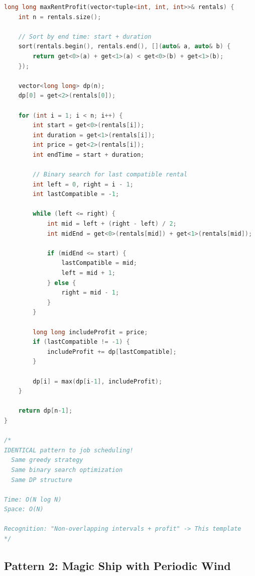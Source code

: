 \documentclass[11pt,a4paper,oneside]{book}
\begin{document}
\begin{lstlisting}[language=C++, caption=Complete Job Scheduling Solutions - NEW PROBLEMS]
long long maxRentProfit(vector<tuple<int, int, int>>& rentals) {
    int n = rentals.size();
    
    // Sort by end time: start + duration
    sort(rentals.begin(), rentals.end(), [](auto& a, auto& b) {
        return get<0>(a) + get<1>(a) < get<0>(b) + get<1>(b);
    });
    
    vector<long long> dp(n);
    dp[0] = get<2>(rentals[0]);
    
    for (int i = 1; i < n; i++) {
        int start = get<0>(rentals[i]);
        int duration = get<1>(rentals[i]);
        int price = get<2>(rentals[i]);
        int endTime = start + duration;
        
        // Binary search for last compatible rental
        int left = 0, right = i - 1;
        int lastCompatible = -1;
        
        while (left <= right) {
            int mid = left + (right - left) / 2;
            int midEnd = get<0>(rentals[mid]) + get<1>(rentals[mid]);
            
            if (midEnd <= start) {
                lastCompatible = mid;
                left = mid + 1;
            } else {
                right = mid - 1;
            }
        }
        
        long long includeProfit = price;
        if (lastCompatible != -1) {
            includeProfit += dp[lastCompatible];
        }
        
        dp[i] = max(dp[i-1], includeProfit);
    }
    
    return dp[n-1];
}

/*
IDENTICAL pattern to job scheduling!
  Same greedy strategy
  Same binary search optimization
  Same DP structure

Time: O(N log N)
Space: O(N)

Recognition: "Non-overlapping intervals + profit" -> This template
*/
\end{lstlisting}

\subsection{Pattern 2: Magic Ship with Periodic Wind}
\end{document}
